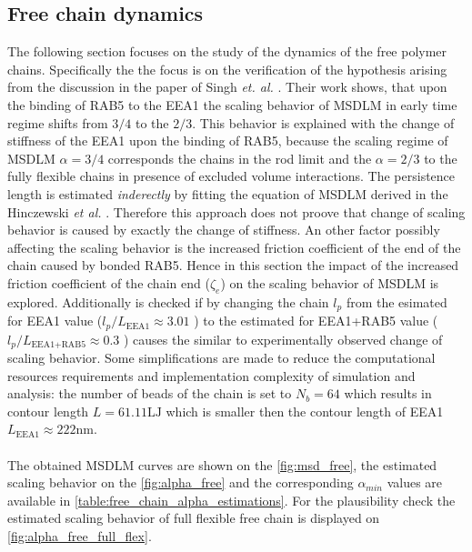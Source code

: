 \documentclass[
    paper=A4,pagesize=automedia,fontsize=12pt,
    BCOR=15mm,DIV=22,
    twoside,headinclude,footinclude=false,
    fleqn,             %
    bibliography=totocnumbered,          %
    listof=totoc,                %
    listof=flat,                 %
    cleardoublepage=empty      %
    numbers=endperiod
]{scrartcl}
\begin{document}
\subsection{Free chain dynamics}
The following section focuses on the study of the dynamics of the 
free polymer chains. Specifically the the focus is on the verification
of the hypothesis arising from the discussion in the paper of 
Singh \emph{et. al.} \cite{Singh:2022}. Their work shows, that upon the 
binding of RAB5 to the EEA1 the scaling behavior of MSDLM in 
early time regime shifts from $3/4$ to the $2/3$. This behavior is explained
with the change of stiffness of the EEA1 upon the binding of RAB5, because
the scaling regime of MSDLM $\alpha=3/4$ corresponds the chains in the rod limit
and the $\alpha=2/3$ to the fully flexible chains in presence of excluded
volume interactions. The persistence length is estimated \emph{inderectly} by 
fitting the equation of MSDLM \cite{Singh:2022} derived in 
the Hinczewski \emph{et al.} \cite{Hinczewski_2009}. Therefore this approach does
not proove that change of scaling behavior is caused by exactly the change
of stiffness. An other factor possibly affecting the scaling behavior
is the increased friction coefficient of the end of the chain caused by 
bonded RAB5. Hence in this section the impact of the increased friction 
coefficient of the chain end ($\zeta_e$) on the scaling behavior of MSDLM is explored.
Additionally is checked if by changing the chain $l_p$ from the 
esimated for EEA1 value ($l_p/L_{\text{EEA1}} \approx 3.01$ \cite{Singh:2022}) to
the estimated for EEA1+RAB5 value 
($l_p/L_{\text{EEA1+RAB5}} \approx 0.3$ \cite{Singh:2022}) causes the 
similar to experimentally observed change of scaling behavior.
Some simplifications are made to reduce the computational resources
requirements and implementation complexity of simulation and analysis:
the number of beads of the chain is set to $N_b=64$ which results in 
contour length $L=61.11\text{LJ}$ which is smaller then the contour length of EEA1
$L_{\text{EEA1}}\approx222\text{nm}$.
\\
\\
The obtained MSDLM curves are shown on the \autoref{fig:msd_free}, the 
estimated scaling behavior on the \autoref{fig:alpha_free} and the 
corresponding $\alpha_{min}$ values are available in \autoref{table:free_chain_alpha_estimations}.
For the plausibility check the estimated scaling behavior of full flexible free chain is
displayed on \autoref{fig:alpha_free_full_flex}. 
\\
\\
\end{document}
